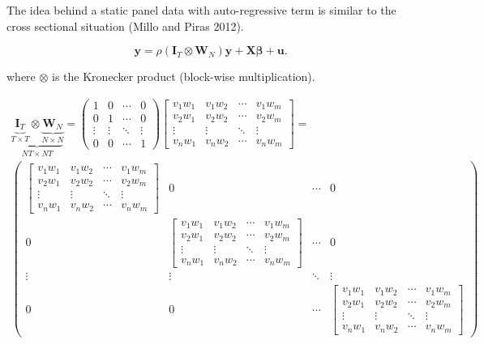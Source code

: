 \documentclass[
  letterpaper,
]{scrbook}
\begin{document}
The idea behind a static panel data with auto-regressive term is similar
to the cross sectional situation (Millo and Piras 2012).

\[
        {\boldsymbol{\mathbf{y}}}= \rho(\boldsymbol{\mathbf{I}}_T\otimes {\boldsymbol{\mathbf{W}}_N}){\boldsymbol{\mathbf{y}}}+{\boldsymbol{\mathbf{X}}}{\boldsymbol{\mathbf{\beta}}}+ {\boldsymbol{\mathbf{u}}}.
\]

where \(\otimes\) is the Kronecker product (block-wise multiplication).

\[
\begin{split}
\underbrace{\underbrace{\boldsymbol{\mathbf{I}}_T}_{T \times T} \otimes \underbrace{\boldsymbol{\mathbf{W}}_N}_{N \times N}}_{NT \times NT}=
\begin{pmatrix}
      1 & 0 & \cdots & 0  \\
      0 & 1 & \cdots & 0  \\
      \vdots & \vdots & \ddots & \vdots \\
      0 & 0 & \cdots & 1
\end{pmatrix}
\left[\begin{array}{cccc}
v_{1} w_{1} & v_{1} w_{2} & \cdots & v_{1} w_{m} \\
v_{2} w_{1} & v_{2} w_{2} & \cdots & v_{2} w_{m} \\
\vdots & \vdots & \ddots & \vdots \\
v_{n} w_{1} & v_{n} w_{2} & \cdots & v_{n} w_{m}
\end{array}\right] =\\
\begin{pmatrix}
      \left[\begin{array}{cccc}
v_{1} w_{1} & v_{1} w_{2} & \cdots & v_{1} w_{m} \\
v_{2} w_{1} & v_{2} w_{2} & \cdots & v_{2} w_{m} \\
\vdots & \vdots & \ddots & \vdots \\
v_{n} w_{1} & v_{n} w_{2} & \cdots & v_{n} w_{m}
\end{array}\right] & 0 & \cdots & 0  \\
      0 & \left[\begin{array}{cccc}
v_{1} w_{1} & v_{1} w_{2} & \cdots & v_{1} w_{m} \\
v_{2} w_{1} & v_{2} w_{2} & \cdots & v_{2} w_{m} \\
\vdots & \vdots & \ddots & \vdots \\
v_{n} w_{1} & v_{n} w_{2} & \cdots & v_{n} w_{m}
\end{array}\right] & \cdots & 0  \\
      \vdots & \vdots & \ddots & \vdots \\
      0 & 0 & \cdots & \left[\begin{array}{cccc}
v_{1} w_{1} & v_{1} w_{2} & \cdots & v_{1} w_{m} \\
v_{2} w_{1} & v_{2} w_{2} & \cdots & v_{2} w_{m} \\
\vdots & \vdots & \ddots & \vdots \\
v_{n} w_{1} & v_{n} w_{2} & \cdots & v_{n} w_{m}
\end{array}\right]
\end{pmatrix}
\end{split}
\]
\end{document}
